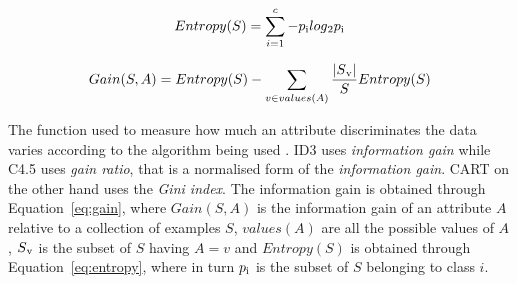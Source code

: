 \documentclass{article}[paper=a4,pagesize=auto,10pt]
\begin{document}
\begin{equation}\label{eq:entropy}
	Entropy(S) = \sum_{i=1}^{c} -p\textsubscript{i} log\textsubscript{2}p\textsubscript{i}
\end{equation}\smallskip

\begin{equation}\label{eq:gain}
	Gain(S,A) =  Entropy(S) - \sum_{v\in values(A)} \frac{|S\textsubscript{v}|}{S} Entropy(S)
\end{equation}\smallskip

The function used to measure how much an attribute discriminates the data varies according to the algorithm being used \cite{han2011data}. ID3 uses \textit{information gain} while C4.5 uses \textit{gain ratio}, that is a normalised form of the \textit{information gain}. CART on the other hand uses the \textit{Gini index}. The information gain is obtained through Equation~\ref{eq:gain}, where $Gain(S,A)$ is the information gain of an attribute $A$ relative to a collection of examples $S$, $values(A)$ are all the possible values of $A$, $S\textsubscript{v}$ is the subset of $S$ having $A=v$ and $Entropy(S)$ is obtained through Equation~\ref{eq:entropy}, where in turn $p\textsubscript{i}$ is the subset of $S$ belonging to class $i$.
\end{document}
